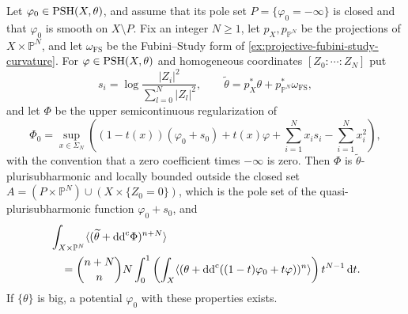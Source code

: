 \begin{proposition}\label{prop:auxiliary-projective-mass}
Let $\varphi_0\in\mathrm{PSH}(X,\theta)$, and assume that its pole set $P=\{\varphi_0=-\infty\}$ is closed and that $\varphi_0$ is smooth on $X\setminus P$. Fix an integer $N\geq1$, let $p_X,p_{\mathbb P^N}$ be the projections of $X\times\mathbb P^N$, and let $\omega_{\mathrm{FS}}$ be the Fubini--Study form of \cref{ex:projective-fubini-study-curvature}. For $\varphi\in\mathrm{PSH}(X,\theta)$ and homogeneous coordinates $[Z_0:\cdots:Z_N]$ put
\[
 s_i=\log\frac{|Z_i|^2}{\sum_{l=0}^N|Z_l|^2},\qquad
 \widetilde\theta=p_X^*\theta+p_{\mathbb P^N}^*\omega_{\mathrm{FS}},
\]
and let $\Phi$ be the upper semicontinuous regularization of
\[
 \Phi_0=\sup_{x\in\Sigma_N}
       \left((1-t(x))(\varphi_0+s_0)+t(x)\varphi
                              +\sum_{i=1}^N x_i s_i-\sum_{i=1}^N x_i^2\right),
\]
with the convention that a zero coefficient times $-\infty$ is zero. Then $\Phi$ is $\widetilde\theta$-plurisubharmonic and locally bounded outside the closed set $A=(P\times\mathbb P^N)\cup(X\times\{Z_0=0\})$, which is the pole set of the quasi-plurisubharmonic function $\varphi_0+s_0$, and
\begin{equation}\label{eq:auxiliary-projective-mass}
 \begin{aligned}
 &\int_{X\times\mathbb P^N}\langle(\widetilde\theta+\mathrm{dd}^{\mathrm{c}}\Phi)^{n+N}\rangle\\
 &\quad=\binom{n+N}{n}N\int_0^1
       \left(\int_X\langle(\theta+\mathrm{dd}^{\mathrm{c}}((1-t)\varphi_0+t\varphi))^n\rangle\right)
                                      t^{N-1}\,\mathrm dt.
 \end{aligned}
\end{equation}
If $\{\theta\}$ is big, a potential $\varphi_0$ with these properties exists.
\end{proposition}
